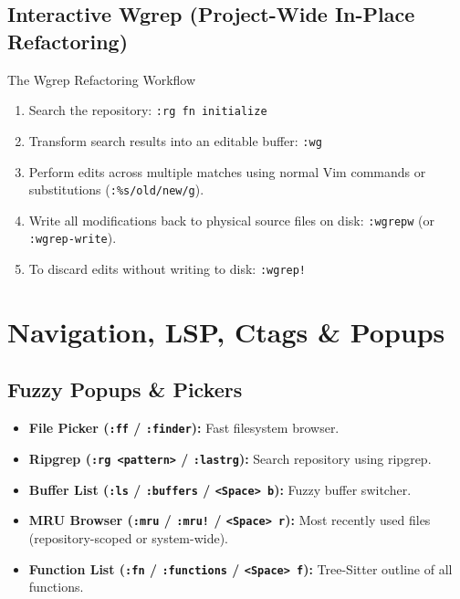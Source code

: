 \documentclass[11pt,a4paper,openany]{book}
\newcommand{\code}[1]{\colorbox{inlinebg}{\texttt{#1}}}
\begin{document}
\section{Interactive Wgrep (Project-Wide In-Place Refactoring)}
\begin{recipebox}{The Wgrep Refactoring Workflow}
\begin{enumerate}[noitemsep]
    \item Search the repository: \code{:rg fn initialize}
    \item Transform search results into an editable buffer: \code{:wg}
    \item Perform edits across multiple matches using normal Vim commands or substitutions (\code{:\%s/old/new/g}).
    \item Write all modifications back to physical source files on disk: \code{:wgrepw} (or \code{:wgrep-write}).
    \item To discard edits without writing to disk: \code{:wgrep!}
\end{enumerate}
\end{recipebox}

\chapter{Navigation, LSP, Ctags \& Popups}

\section{Fuzzy Popups \& Pickers}
\begin{itemize}[noitemsep]
    \item \textbf{File Picker (\code{:ff} / \code{:finder}):} Fast filesystem browser.
    \item \textbf{Ripgrep (\code{:rg <pattern>} / \code{:lastrg}):} Search repository using ripgrep.
    \item \textbf{Buffer List (\code{:ls} / \code{:buffers} / \code{<Space> b}):} Fuzzy buffer switcher.
    \item \textbf{MRU Browser (\code{:mru} / \code{:mru!} / \code{<Space> r}):} Most recently used files (repository-scoped or system-wide).
    \item \textbf{Function List (\code{:fn} / \code{:functions} / \code{<Space> f}):} Tree-Sitter outline of all functions.
\end{itemize}
\end{document}
